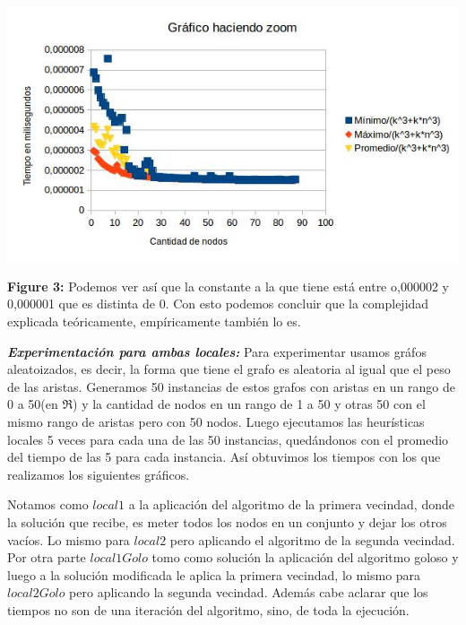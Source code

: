 \documentclass[a4paper]{article}
\begin{document}
\includegraphics[width=\textwidth,height=\textheight,keepaspectratio
]{local2KfijoConstanteZoom.jpg}
\begin {flushleft}
\textbf{Figure 3:} Podemos ver así que la constante a la que tiene está entre o,000002 y 0,000001 que es distinta de 0. Con esto podemos concluir que la complejidad explicada teóricamente, empíricamente también lo es.
\end{flushleft}
\vspace{0.4cm}
\textbf{\textit{Experimentación para ambas locales:}\newline}
Para experimentar usamos gráfos aleatoizados, es decir, la forma que tiene el grafo es aleatoria al igual que el peso de las aristas. Generamos 50 instancias de estos grafos con aristas en un rango de 0 a 50(en $\Re$) y la cantidad de nodos en un rango de 1 a 50 y otras 50 con el mismo rango de aristas pero con 50 nodos. 
Luego ejecutamos las heurísticas locales 5 veces para cada una de las 50 instancias, quedándonos con el promedio del tiempo de las 5 para cada instancia. Así obtuvimos los tiempos con los que realizamos los siguientes gráficos.\newline


Notamos como $local1$ a la aplicación del algoritmo de la primera vecindad, donde la solución que recibe, es meter todos los nodos en un conjunto y dejar los otros vacíos. Lo mismo para $local2$ pero aplicando el algoritmo de la segunda vecindad. Por otra parte $local1Golo$ tomo como solución la aplicación del algoritmo goloso y luego a la solución modificada le aplica la primera vecindad, lo mismo para $local2Golo$ pero aplicando la segunda vecindad. Además cabe aclarar que los tiempos no son de una iteración del algoritmo, sino, de toda la ejecución.\newline
\end{document}

